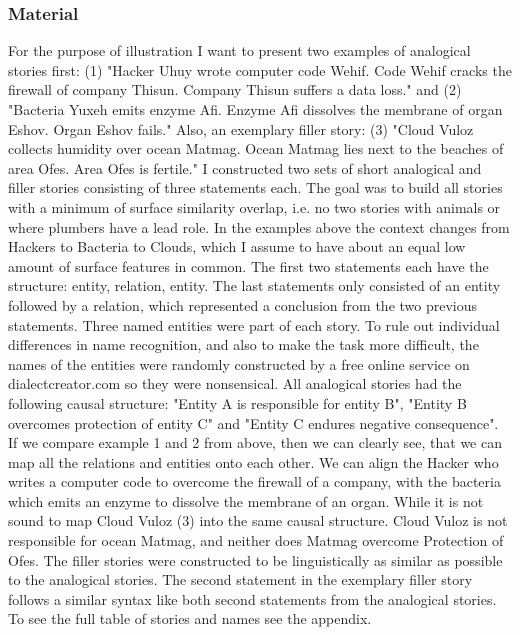 \documentclass[a4paper,man,natbib,floatsintext,import]{apa6}
\begin{document}
\subsubsection{Material}
For the purpose of illustration I want to present two examples of analogical stories first: (1) "Hacker Uhuy wrote computer code Wehif. Code Wehif cracks the firewall of company Thisun. Company Thisun suffers a data loss." and (2) "Bacteria Yuxeh emits enzyme Afi. Enzyme Afi dissolves the membrane of organ Eshov. Organ Eshov fails." Also, an exemplary filler story: (3) "Cloud Vuloz collects humidity over ocean Matmag. Ocean Matmag lies next to the beaches of area Ofes. Area Ofes is fertile."
I constructed two sets of short analogical and filler stories consisting of three statements each. The goal was to build all stories with a minimum of surface similarity overlap, i.e. no two stories with animals or where plumbers have a lead role. In the examples above the context changes from Hackers to Bacteria to Clouds, which I assume to have about an equal low amount of surface features in common. The first two statements each have the structure: entity, relation, entity. The last statements only consisted of an entity followed by a relation, which represented a conclusion from the two previous statements. Three named entities were part of each story.  To rule out individual differences in name recognition, and also to make the task more difficult, the names of the entities were randomly constructed by a free online service on dialectcreator.com so they were nonsensical. All analogical stories had the following causal structure: "Entity A is responsible for entity B", "Entity B overcomes protection of entity C" and "Entity C endures negative consequence". If we compare example 1 and 2 from above, then we can clearly see, that we can map all the relations and entities onto each other. We can align the Hacker who writes a computer code to overcome the firewall of a company, with the bacteria which emits an enzyme to dissolve the membrane of an organ. While it is not sound to map Cloud Vuloz (3) into the same causal structure. Cloud Vuloz is not responsible for ocean Matmag, and neither does Matmag overcome Protection of Ofes. The filler stories were constructed to be linguistically as similar as possible to the analogical stories. The second statement in the exemplary filler story follows a similar syntax like both second statements from the analogical stories. To see the full table of stories and names see the appendix.
\end{document}
